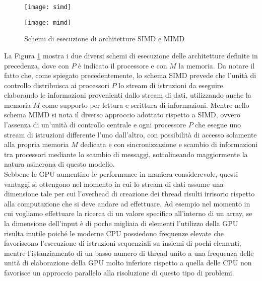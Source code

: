 \begin{figure}[t]
    \begin{minipage}[b]{.5\linewidth}
        \centering
        \texttt{[image: simd]}
    \end{minipage}
    \begin{minipage}[b]{.5\linewidth}
        \centering
        \texttt{[image: mimd]}
    \end{minipage}
    \caption{Schemi di esecuzione di architetture SIMD e MIMD}
    \label{fig:simd-mimd}
\end{figure}

La Figura \ref{fig:simd-mimd} mostra i due diversi schemi di esecuzione
delle architetture definite in precedenza, dove con $P$ è indicato il processore
e con $M$ la memoria. Da notare il fatto che, come spiegato precedentemente,
lo schema SIMD prevede che l'unità di controllo distribuisca ai processori $P$
lo stream di istruzioni da eseguire elaborando le informazioni
provenienti dallo stream di dati, utilizzando anche la memoria $M$ come supporto
per lettura e scrittura di informazioni. Mentre nello schema MIMD si nota
il diverso approccio adottato rispetto a SIMD, ovvero l'assenza di un'unità
di controllo centrale e ogni processore $P$ che esegue
uno stream di istruzioni differente l'uno dall'altro,
con possibilità di accesso solamente alla
propria memoria $M$ dedicata e con sincronizzazione e scambio di informazioni
tra processori mediante lo scambio di messaggi, sottolineando maggiormente
la natura asincrona di questo modello.
\\
Sebbene le GPU aumentino le performance in maniera considerevole, questi
vantaggi si ottengono nel momento in cui lo stream di dati assume
una dimensione tale per cui l'overhead di creazione dei thread risulti
irrisorio rispetto alla computazione che si deve andare ad effettuare.
Ad esempio nel momento in cui vogliamo effettuare la ricerca di un valore
specifico all'interno di un array, se la dimensione dell'input è di poche
migliaia di elementi l'utilizzo della GPU risulta inutile poiché
le moderne CPU possiedono frequenze elevate che favoriscono l'esecuzione
di istruzioni sequenziali su insiemi di pochi elementi, mentre l'istanziamento
di un basso numero di thread unito a una frequenza delle unità di elaborazione
della GPU molto inferiore rispetto a quella delle CPU non favorisce un
approccio parallelo alla risoluzione di questo tipo di problemi.
